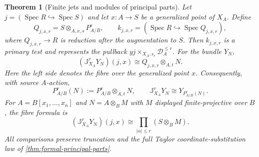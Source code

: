 \documentclass[11pt,a4paper]{article}
\numberwithin{algorithm}{section}
\numberwithin{equation}{section}
\newtheorem{theorem}{Theorem}[section]
\theoremstyle{definition}
\theoremstyle{remark}
\theoremstyle{plain}
\theoremstyle{definition}
\theoremstyle{plain}
\begin{document}
\begin{theorem}[Finite jets and modules of principal parts]
\label{thm:primary-jet-coefficients}
Let $j=(\operatorname{Spec}R\hookrightarrow\operatorname{Spec}S)$
and let $x:A\to S$ be a generalized point of $X_A$.
Define
\[
 Q_{j,x,r}=S\otimes_{A,x,s}P^r_{A/B},\qquad
 k_{j,x,r}=(\operatorname{Spec}R\hookrightarrow
                         \operatorname{Spec}Q_{j,x,r}),
\]
where $Q_{j,x,r}\to R$ is reduction after the augmentation to $S$.
Then $k_{j,x,r}$ is a primary test and represents the pullback
$yj\times_{X_A,s_r}\mathcal D_A^{\le r}$.  For the bundle $Y_N$,
\begin{equation}\label{eq:primary-jet-coefficients}
 (\mathbb J_{X_A}^rY_N)(j,x)
 \cong Q_{j,x,r}\otimes_{A,t}N.
\end{equation}
Here the left side denotes the fibre over the generalized point $x$.
Consequently, with source $A$-action,
\begin{equation}\label{eq:primary-jets-principal-module}
 P^r_{A/B}(N):=P^r_{A/B}\otimes_{A,t}N,
 \qquad
 \mathbb J_{X_A}^rY_N\cong Y_{P^r_{A/B}(N)}.
\end{equation}
For $A=B[x_1,\ldots,x_n]$ and $N=A\otimes_BM$ with $M$
displayed finite-projective over $B$, the fibre formula is
\[
 (\mathbb J_{X_A}^rY_N)(j,x)
 \cong\prod_{|\alpha|\le r}(S\otimes_BM).
\]
All comparisons preserve truncation and the full Taylor
coordinate-substitution law of \cref{thm:formal-principal-parts}.
\end{theorem}
\end{document}

